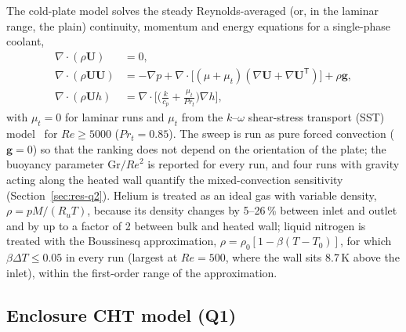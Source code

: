 \documentclass[preprint,12pt]{elsarticle}
\renewcommand{\Re}{\mathit{Re}}
\renewcommand{\Pr}{\mathit{Pr}}
\begin{document}
The cold-plate model solves the steady Reynolds-averaged (or, in the laminar range, the
plain) continuity, momentum and energy equations for a single-phase coolant,
\begin{align}
\nabla\cdot(\rho\mathbf U)&=0,\\
\nabla\cdot(\rho\mathbf U\mathbf U)&=-\nabla p+\nabla\cdot\big[(\mu+\mu_t)
(\nabla\mathbf U+\nabla\mathbf U^{\mathsf T})\big]+\rho\mathbf g,\\
\nabla\cdot(\rho\mathbf U h)&=\nabla\cdot\Big[\Big(\frac{k}{c_p}+\frac{\mu_t}{\Pr_t}\Big)\nabla h\Big],
\label{eq:energy}
\end{align}
with $\mu_t=0$ for laminar runs and $\mu_t$ from the $k$--$\omega$ shear-stress transport (SST)
model~\cite{Menter1994SST} for $\Re\ge 5000$ ($\Pr_t=0.85$). The sweep is run as pure
forced convection ($\mathbf g=0$) so that the ranking does not depend on the orientation of
the plate; the buoyancy parameter $\mathrm{Gr}/\Re^2$ is reported for every run, and four
runs with gravity acting along the heated wall quantify the mixed-convection sensitivity
(Section~\ref{sec:res-q2}). Helium is treated as an ideal gas
with variable density, $\rho=pM/(R_uT)$, because its density changes by 5--26\,\% between inlet and outlet and by up to a factor of 2 between bulk and heated wall; liquid nitrogen is treated with the Boussinesq
approximation, $\rho=\rho_0[1-\beta(T-T_0)]$, for which $\beta\Delta T\le0.05$ in every run
(largest at $\Re=500$, where the wall sits 8.7\,K above the inlet), within the first-order
range of the approximation.

\subsection{Enclosure CHT model (Q1)}
\label{sec:enclosure}
\end{document}
